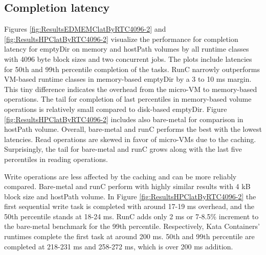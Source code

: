 \subsection{Completion latency}

Figures \ref{fig:ResultsEDMEMClatByRTC4096-2} and \ref{fig:ResultsHPClatByRTC4096-2} visualize the performance for completion latency for emptyDir on memory and hostPath volumes by all runtime classes with 4096 byte block sizes and two concurrent jobs. The plots include latencies for 50th and 99th percentile completion of the tasks. RunC narrowly outperforms VM-based runtime classes in memory-based emptyDir by a 3 to 10 ms margin. This tiny difference indicates the overhead from the micro-VM to memory-based operations. The tail for completion of last percentiles in memory-based volume operations is relatively small compared to disk-based emptyDir. Figure \ref{fig:ResultsHPClatByRTC4096-2} includes also bare-metal for comparison in hostPath volume. Overall, bare-metal and runC performs the best with the lowest latencies. Read operations are skewed in favor of micro-VMs due to the caching. Surprisingly, the tail for bare-metal and runC grows along with the last five percentiles in reading operations.

Write operations are less affected by the caching and can be more reliably compared. Bare-metal and runC perform with highly similar results with 4 kB block size and hostPath volume. In Figure \ref{fig:ResultsHPClatByRTC4096-2} the first sequential write task is completed with around 17-19 ms overhead, and the 50th percentile stands at 18-24 ms. RunC adds only 2 ms or 7-8.5\% increment to the bare-metal benchmark for the 99th percentile. Respectively, Kata Containers' runtimes complete the first task at around 200 ms. 50th and 99th percentile are completed at 218-231 ms and 258-272 ms, which is over 200 ms addition.

